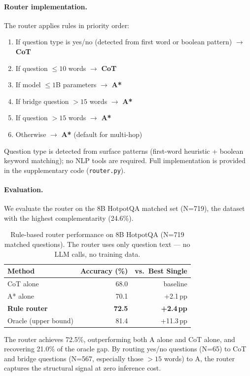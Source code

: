\documentclass{article}
\begin{document}
\paragraph{Router implementation.}
The router applies rules in priority order:
\begin{enumerate}[leftmargin=*, noitemsep]
  \item If question type is yes/no (detected from first word or boolean pattern) $\to$ \textbf{CoT}
  \item If question $\leq 10$ words $\to$ \textbf{CoT}
  \item If model $\leq 1$B parameters $\to$ \textbf{A*}
  \item If bridge question $> 15$ words $\to$ \textbf{A*}
  \item If question $> 15$ words $\to$ \textbf{A*}
  \item Otherwise $\to$ \textbf{A*} (default for multi-hop)
\end{enumerate}
Question type is detected from surface patterns (first-word heuristic + boolean keyword matching); no NLP tools are required. Full implementation is provided in the supplementary code (\texttt{router.py}).

\paragraph{Evaluation.}
We evaluate the router on the 8B HotpotQA matched set (N=719), the dataset with the highest complementarity (24.6\%).

\begin{table}[h]
\centering
\caption{Rule-based router performance on 8B HotpotQA (N=719 matched questions). The router uses only question text --- no LLM calls, no training data.}
\label{tab:router}
\small
\begin{tabular}{lrr}
\toprule
Method & Accuracy (\%) & vs.\ Best Single \\
\midrule
CoT alone      & 68.0 & baseline \\
A* alone       & 70.1 & +2.1\,pp \\
\textbf{Rule router} & \textbf{72.5} & \textbf{+2.4\,pp} \\
Oracle (upper bound) & 81.4 & +11.3\,pp \\
\bottomrule
\end{tabular}
\end{table}

The router achieves 72.5\%, outperforming both A\* alone and CoT alone, and recovering 21.0\% of the oracle gap. By routing yes/no questions (N=65) to CoT and bridge questions (N=567, especially those $>15$ words) to A\*, the router captures the structural signal at zero inference cost.
\end{document}
